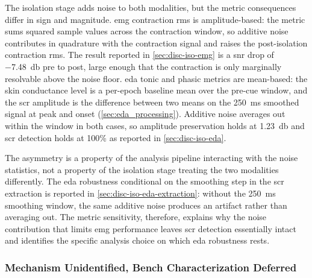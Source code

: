 The isolation stage adds noise to both modalities, but the metric consequences differ in sign and magnitude. \gls{emg} contraction \gls{rms} is amplitude-based: the metric sums squared sample values across the contraction window, so additive noise contributes in quadrature with the contraction signal and raises the post-isolation contraction \gls{rms}. The result reported in \autoref{sec:disc-iso-emg} is a \gls{snr} drop of \SI{-7.48}{\decibel} pre to post, large enough that the contraction is only marginally resolvable above the noise floor. \gls{eda} tonic and phasic metrics are mean-based: the skin conductance level is a per-epoch baseline mean over the pre-cue window, and the \gls{scr} amplitude is the difference between two means on the \SI{250}{\milli\second} smoothed signal at peak and onset (\autoref{sec:eda_processing}). Additive noise averages out within the window in both cases, so amplitude preservation holds at \SI{+1.23}{\decibel} and \gls{scr} detection holds at 100\% as reported in \autoref{sec:disc-iso-eda}.

The asymmetry is a property of the analysis pipeline interacting with the noise statistics, not a property of the isolation stage treating the two modalities differently. The \gls{eda} robustness conditional on the smoothing step in the \gls{scr} extraction is reported in \autoref{sec:disc-iso-eda-extraction}: without the \SI{250}{\milli\second} smoothing window, the same additive noise produces an artifact rather than averaging out. The metric sensitivity, therefore, explains why the noise contribution that limits \gls{emg} performance leaves \gls{scr} detection essentially intact and identifies the specific analysis choice on which \gls{eda} robustness rests.

\subsubsection{Mechanism Unidentified, Bench Characterization Deferred}
\label{sec:disc-iso-synthesis-mechanism}

